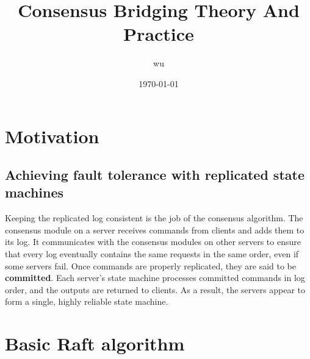 \documentclass[11pt]{article}
\author{wu}
\date{\today}
\title{Consensus Bridging Theory And Practice}
\begin{document}
\maketitle
\section{Motivation}
\label{sec:org0f16dc8}

\subsection{Achieving fault tolerance with replicated state machines}
\label{sec:orgc674558}
Keeping the replicated log consistent is the job of the consensus algorithm. The consensus module on a
server receives commands from clients and adds them to its log. It communicates with the consensus
modules on other servers to ensure that every log eventually contains the same requests in the same
order, even if some servers fail. Once commands are properly replicated, they are said to be
\textbf{committed}. Each server’s state machine processes committed commands in log order, and the outputs are
returned to clients. As a result, the servers appear to form a single, highly reliable state machine.
\section{Basic Raft algorithm}
\label{sec:org8d669b9}
\end{document}
